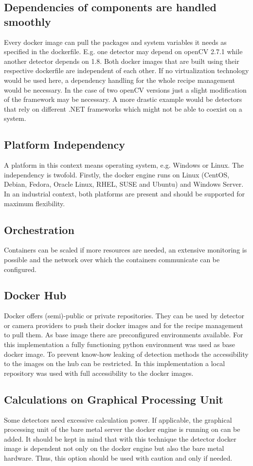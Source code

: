 \subsection{Dependencies of components are handled smoothly} 
Every docker image can pull the packages and system variables it needs as specified in the dockerfile. E.g. one detector may depend on openCV 2.7.1 while another detector depends on 1.8. Both docker images that are built using their respective dockerfile are independent of each other. If no virtualization technology would be used here, a dependency handling for the whole recipe management would be necessary. In the case of two openCV versions just a slight modification of the framework may be necessary. A more drastic example would be detectors that rely on different .NET frameworks which might not be able to coexist on a system.
\subsection{Platform Independency}
 A platform in this context means operating system, e.g. Windows or Linux. The independency is twofold. Firstly, the docker engine runs on Linux (CentOS, Debian, Fedora, Oracle Linux, RHEL, SUSE and Ubuntu) and Windows Server. In an industrial context, both platforms are present and should be supported for maximum flexibility.
\subsection{Orchestration}
 Containers can be scaled if more resources are needed, an extensive monitoring is possible and the network over which the containers communicate can be configured. 
\subsection{Docker Hub}
 Docker offers (semi)-public or private repositories. They can be used by detector or camera providers to push their docker images and for the recipe management to pull them. As base image there are preconfigured environments available. For this implementation a fully functioning python environment was used as base docker image. To prevent know-how leaking of detection methods the accessibility to the images on the hub can be restricted. In this implementation a local repository was used with full accessibility to the docker images.
 \subsection{Calculations on Graphical Processing Unit}
 Some detectors need excessive calculation power. If applicable, the graphical processing unit of the bare metal server the docker engine is running on can be added. It should be kept in mind that with this technique the detector docker image is dependent not only on the docker engine but also the bare metal hardware. Thus, this option should be used with caution and only if needed.
